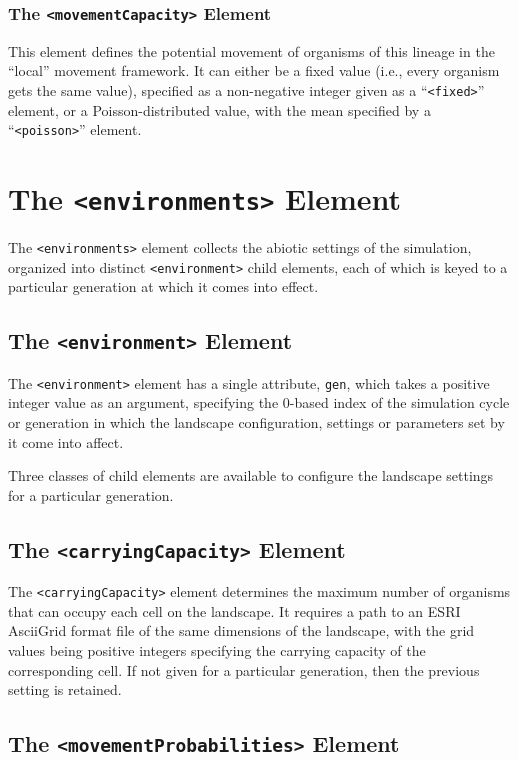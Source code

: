 \documentclass[11pt]{article}
\newcommand{\xmlelem}[1]{{\tt<\textcolor{xmlelem}{#1}>}}
\newcommand{\xmlattr}[1]{{\tt\textcolor{xmlattr}{#1}}}
\begin{document}
\subsubsection{The \xmlelem{movementCapacity} Element}
This element defines the potential movement of organisms of this lineage in the ``local'' movement framework. It can either be a fixed value (i.e., every organism gets the same value), specified as a non-negative integer given as a ``\xmlelem{fixed}'' element, or a Poisson-distributed value, with the mean specified by a ``\xmlelem{poisson}'' element.

\section{The \xmlelem{environments} Element}

The \xmlelem{environments} element collects the abiotic settings of the simulation, organized into distinct \xmlelem{environment} child elements, each of which is keyed to a particular generation at which it comes into effect.

\subsection{The \xmlelem{environment} Element}
The \xmlelem{environment} element has a single attribute, \xmlattr{gen}, which takes a positive integer value as an argument, specifying the 0-based index of the simulation cycle or generation in which the landscape configuration, settings or parameters set by it come into affect.

Three classes of child elements are available to configure the landscape settings for a particular generation.

\subsection{The \xmlelem{carryingCapacity} Element}

The \xmlelem{carryingCapacity} element determines the maximum number of organisms that can occupy each cell on the landscape. It requires a path to an ESRI AsciiGrid format file of the same dimensions of the landscape, with the grid values being positive integers specifying the carrying capacity of the corresponding cell. If not given for a particular generation, then the previous setting is retained.


\subsection{The \xmlelem{movementProbabilities} Element}
\end{document}
